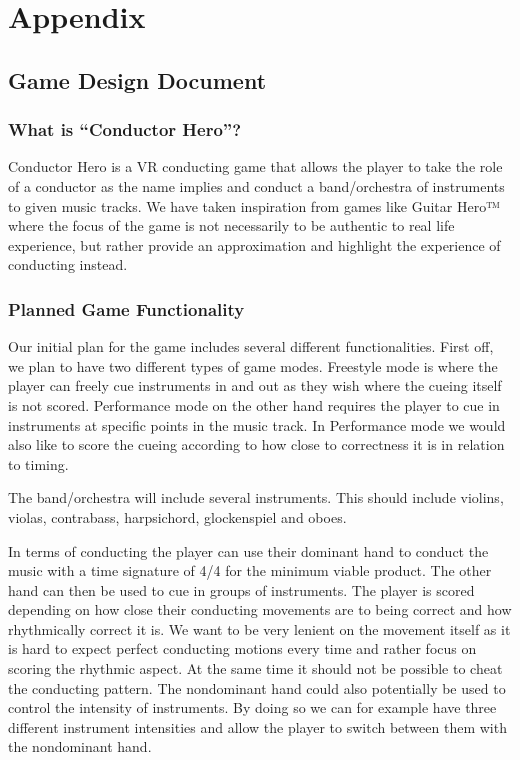 \appendix 
\chapter{Appendix} \label{chap:appendix}
\section{Game Design Document}

\subsection{What is “Conductor Hero”?}
Conductor Hero is a VR conducting game that allows the player to take the role of a conductor as the name implies and conduct a band/orchestra of instruments to given music tracks. We have taken inspiration from games like Guitar Hero™ where the focus of the game is not necessarily to be authentic to real life experience, but rather provide an approximation and highlight the experience of conducting instead. 

\subsection{Planned Game Functionality}
Our initial plan for the game includes several different functionalities. First off, we plan to have two different types of game modes. Freestyle mode is where the player can freely cue instruments in and out as they wish where the cueing itself is not scored. Performance mode on the other hand requires the player to cue in instruments at specific points in the music track. In Performance mode we would also like to score the cueing according to how close to correctness it is in relation to timing. 

The band/orchestra will include several instruments. This should include violins, violas, contrabass, harpsichord, glockenspiel and oboes. 

In terms of conducting the player can use their dominant hand to conduct the music with a time signature of 4/4 for the minimum viable product. The other hand can then be used to cue in groups of instruments. The player is scored depending on how close their conducting movements are to being correct and how rhythmically correct it is. We want to be very lenient on the movement itself as it is hard to expect perfect conducting motions every time and rather focus on scoring the rhythmic aspect. At the same time it should not be possible to cheat the conducting pattern. The nondominant hand could also potentially be used to control the intensity of instruments. By doing so we can for example have three different instrument intensities and allow the player to switch between them with the nondominant hand.

